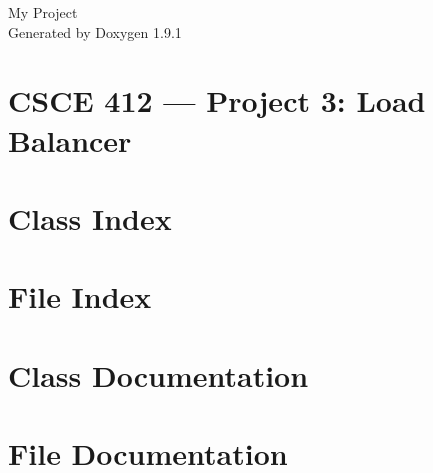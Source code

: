 \let\mypdfximage\pdfximage\def\pdfximage{\immediate\mypdfximage}\documentclass[twoside]{book}
\newcommand{\+}{\discretionary{\mbox{\scriptsize$\hookleftarrow$}}{}{}}
\newcommand{\clearemptydoublepage}{%
  \newpage{\pagestyle{empty}\cleardoublepage}%
}
\begin{document}
\raggedbottom

\hypersetup{pageanchor=false,
             bookmarksnumbered=true,
             pdfencoding=unicode
            }
\begin{titlepage}
\vspace*{7cm}
\begin{center}%
{\Large My Project }\\
\vspace*{1cm}
{\large Generated by Doxygen 1.9.1}\\
\end{center}
\end{titlepage}
\clearemptydoublepage
{}
\tableofcontents
\clearemptydoublepage
{}
\hypersetup{pageanchor=true}

\chapter{CSCE 412 — Project 3\+: Load Balancer}
\label{index}\hypertarget{index}{}
\chapter{Class Index}

\chapter{File Index}

\chapter{Class Documentation}







\chapter{File Documentation}














\backmatter
\newpage
{}
\clearemptydoublepage
{}
\printindex
\end{document}
